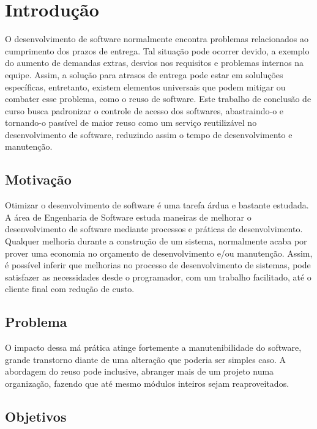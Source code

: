 \chapter{Introdução}


O desenvolvimento de software normalmente encontra problemas relacionados ao cumprimento dos prazos de entrega. Tal situação pode ocorrer devido, a exemplo do aumento de demandas extras, desvios nos requisitos e problemas internos na equipe. Assim, a solução para atrasos de entrega pode estar em soluluções específicas, entretanto, existem elementos universais que podem mitigar ou combater esse problema, como o reuso de software. Este trabalho de conclusão de curso busca padronizar o controle de acesso dos softwares, abastraindo-o e tornando-o passível de maior reuso como um serviço reutilizável no desenvolvimento de software, reduzindo assim o tempo de desenvolvimento e manutenção.


\section{Motivação}


Otimizar o desenvolvimento de software é uma tarefa árdua e bastante estudada. A área de Engenharia de Software estuda maneiras de melhorar o desenvolvimento de software mediante processos e práticas de desenvolvimento. Qualquer melhoria durante a construção de um sistema, normalmente acaba por prover uma economia no orçamento de desenvolvimento e/ou manutenção. Assim, é possível inferir que melhorias no processo de desenvolvimento de sistemas, pode satisfazer as necessidades desde o programador, com um trabalho facilitado, até o cliente final com redução de custo.


\section{Problema} %


O impacto dessa má prática atinge fortemente a manutenibilidade do software, grande transtorno diante de uma alteração que poderia ser simples caso. A abordagem do reuso pode inclusive, abranger mais de um projeto numa organização, fazendo que até mesmo módulos inteiros sejam reaproveitados. 


\section{Objetivos}


